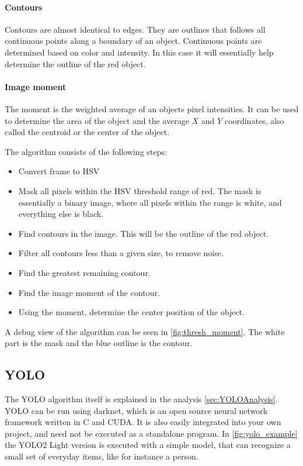 \paragraph{Contours}
Contours are almost identical to edges.
They are outlines that follows all continuous points along a boundary of an object.
Continuous points are determined based on color and intensity.
In this case it will essentially help determine the outline of the red object.\cite{contours}

\paragraph{Image moment}
The moment is the weighted average of an objects pixel intensities.
It can be used to determine the area of the object and the average $X$ and $Y$ coordinates, also called the centroid or the center of the object.


The algorithm consists of the following steps:
\begin{itemize}
	\item Convert frame to HSV
	\item Mask all pixels within the HSV threshold range of red.
	The mask is essentially a binary image, where all pixels within the range is white, and everything else is black.
	\item Find contours in the image. 
	This will be the outline of the red object.
	\item Filter all contours less than a given size, to remove noise.
	\item Find the greatest remaining contour.
	\item Find the image moment of the contour.
	\item Using the moment, determine the center position of the object.
\end{itemize}

A debug view of the algorithm can be seen in \autoref{fig:thresh_moment}.
The white part is the mask and the blue outline is the contour.


\subsection{YOLO}

The YOLO algorithm itself is explained in the analysis \autoref{sec:YOLOAnalysis}.
YOLO can be run using darknet, which is an open source neural network framework written in C and CUDA\cite{darknet13}.
It is also easily integrated into your own project, and need not be executed as a standalone program.
In \autoref{fig:yolo_example} the YOLO2 Light version is executed with a simple model, that can recognize a small set of everyday items, like for instance a person.

